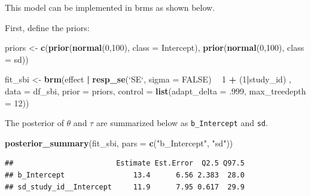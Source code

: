 \documentclass[12pt,]{krantz}
\newenvironment{Shaded}{\begin{snugshade}}{\end{snugshade}}
\newcommand{\KeywordTok}[1]{\textcolor[rgb]{0.13,0.29,0.53}{\textbf{#1}}}
\newcommand{\DataTypeTok}[1]{\textcolor[rgb]{0.13,0.29,0.53}{#1}}
\newcommand{\DecValTok}[1]{\textcolor[rgb]{0.00,0.00,0.81}{#1}}
\newcommand{\FloatTok}[1]{\textcolor[rgb]{0.00,0.00,0.81}{#1}}
\newcommand{\StringTok}[1]{\textcolor[rgb]{0.31,0.60,0.02}{#1}}
\newcommand{\OtherTok}[1]{\textcolor[rgb]{0.56,0.35,0.01}{#1}}
\newcommand{\OperatorTok}[1]{\textcolor[rgb]{0.81,0.36,0.00}{\textbf{#1}}}
\newcommand{\NormalTok}[1]{#1}
\theoremstyle{definition}
\theoremstyle{definition}
\theoremstyle{definition}
\theoremstyle{remark}
\begin{document}
This model can be implemented in brms as shown below.

First, define the priors:

\begin{Shaded}
\begin{Highlighting}[]
\NormalTok{priors <-}\StringTok{ }\KeywordTok{c}\NormalTok{(}\KeywordTok{prior}\NormalTok{(}\KeywordTok{normal}\NormalTok{(}\DecValTok{0}\NormalTok{,}\DecValTok{100}\NormalTok{), }\DataTypeTok{class =}\NormalTok{ Intercept),}
            \KeywordTok{prior}\NormalTok{(}\KeywordTok{normal}\NormalTok{(}\DecValTok{0}\NormalTok{,}\DecValTok{100}\NormalTok{), }\DataTypeTok{class =}\NormalTok{ sd))}
\end{Highlighting}
\end{Shaded}

\begin{Shaded}
\begin{Highlighting}[]
\NormalTok{fit_sbi <-}\StringTok{ }\KeywordTok{brm}\NormalTok{(effect }\OperatorTok{|}\StringTok{ }\KeywordTok{resp_se}\NormalTok{(}\StringTok{`}\DataTypeTok{SE}\StringTok{`}\NormalTok{, }\DataTypeTok{sigma =} \OtherTok{FALSE}\NormalTok{) }\OperatorTok{~}\StringTok{ }\DecValTok{1} \OperatorTok{+}\StringTok{ }\NormalTok{(}\DecValTok{1}\OperatorTok{|}\NormalTok{study_id) , }
               \DataTypeTok{data =}\NormalTok{ df_sbi,}
               \DataTypeTok{prior =}\NormalTok{ priors,}
               \DataTypeTok{control =} \KeywordTok{list}\NormalTok{(}\DataTypeTok{adapt_delta =} \FloatTok{.999}\NormalTok{, }
                              \DataTypeTok{max_treedepth =} \DecValTok{12}\NormalTok{))}
\end{Highlighting}
\end{Shaded}

The posterior of \(\theta\) and \(\tau\) are summarized below as
\texttt{b\_Intercept} and \texttt{sd}.

\begin{Shaded}
\begin{Highlighting}[]
\KeywordTok{posterior_summary}\NormalTok{(fit_sbi, }\DataTypeTok{pars =} \KeywordTok{c}\NormalTok{(}\StringTok{"b_Intercept"}\NormalTok{, }\StringTok{"sd"}\NormalTok{))}
\end{Highlighting}
\end{Shaded}

\begin{verbatim}
##                        Estimate Est.Error  Q2.5 Q97.5
## b_Intercept                13.4      6.56 2.383  28.0
## sd_study_id__Intercept     11.9      7.95 0.617  29.9
\end{verbatim}
\end{document}

